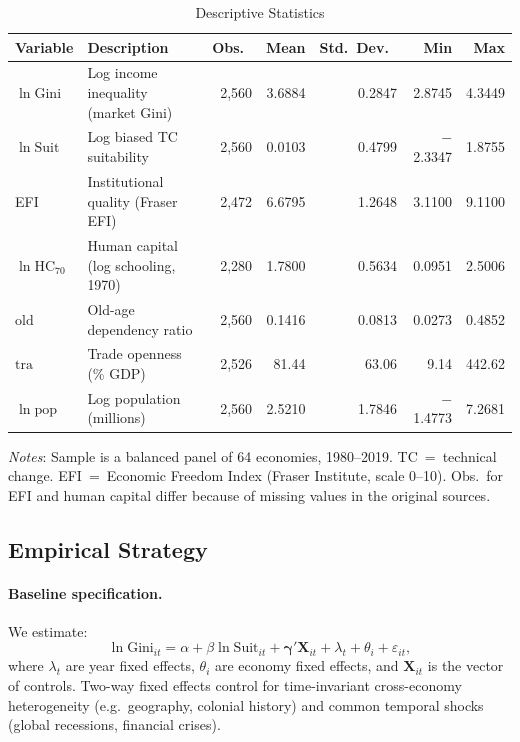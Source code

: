 \documentclass[12pt]{article}
\newcommand{\suit}{\mathrm{Suit}}
\newcommand{\gini}{\mathrm{Gini}}
\newcommand{\hc}{\mathrm{HC}}
\begin{document}
\begin{table}[H]
\centering
\begin{threeparttable}
\caption{Descriptive Statistics}
\label{tab:descriptive}
\small
\begin{tabular}{llrrrrr}
\toprule
Variable & Description & Obs.\ & Mean & Std.\ Dev.\ & Min & Max \\
\midrule
$\ln \gini$
  & Log income inequality (market Gini)
  & 2,560 & 3.6884 & 0.2847 & 2.8745 & 4.3449 \\[2pt]
$\ln \suit$
  & Log biased TC suitability
  & 2,560 & 0.0103 & 0.4799 & $-$2.3347 & 1.8755 \\[2pt]
EFI
  & Institutional quality (Fraser EFI)
  & 2,472 & 6.6795 & 1.2648 & 3.1100 & 9.1100 \\[2pt]
$\ln \hc_{70}$
  & Human capital (log schooling, 1970)
  & 2,280 & 1.7800 & 0.5634 & 0.0951 & 2.5006 \\[2pt]
$\mathrm{old}$
  & Old-age dependency ratio
  & 2,560 & 0.1416 & 0.0813 & 0.0273 & 0.4852 \\[2pt]
$\mathrm{tra}$
  & Trade openness (\% GDP)
  & 2,526 & 81.44 & 63.06 & 9.14 & 442.62 \\[2pt]
$\ln \mathrm{pop}$
  & Log population (millions)
  & 2,560 & 2.5210 & 1.7846 & $-$1.4773 & 7.2681 \\
\bottomrule
\end{tabular}
\begin{tablenotes}
\footnotesize
\item \textit{Notes}: Sample is a balanced panel of 64 economies,
1980--2019. TC~=~technical change. EFI~=~Economic Freedom Index
(Fraser Institute, scale 0--10). Obs.\ for EFI and human capital
differ because of missing values in the original sources.
\end{tablenotes}
\end{threeparttable}
\end{table}

\subsection{Empirical Strategy}

\paragraph{Baseline specification.}
We estimate:
\begin{equation}
  \ln \gini_{it}
    = \alpha + \beta \ln \suit_{it}
    + \boldsymbol{\gamma}' \mathbf{X}_{it}
    + \lambda_t + \theta_i + \varepsilon_{it},
  \label{eq:baseline}
\end{equation}
where $\lambda_t$ are year fixed effects, $\theta_i$ are economy
fixed effects, and $\mathbf{X}_{it}$ is the vector of controls.
Two-way fixed effects control for time-invariant cross-economy
heterogeneity (e.g.\ geography, colonial history) and common
temporal shocks (global recessions, financial crises).
\end{document}
